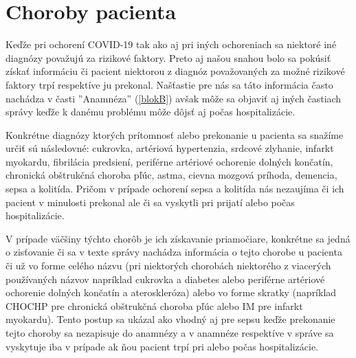 \section{Choroby pacienta}

Keďže pri ochorení COVID-19 tak ako aj pri iných ochoreniach sa niektoré iné diagnózy považujú za rizikové faktory. Preto aj našou snahou bolo sa pokúsiť získať informáciu či pacient niektorou z diagnóz považovaných za možné rizikové faktory trpí respektíve ju prekonal. Našťastie pre nás sa táto informácia často nachádza v časti ''Anamnéza'' (\ref{blokB}) avšak môže sa objaviť aj iných častiach správy keďže k danému problému môže dôjsť aj počas hospitalizácie.

Konkrétne diagnózy ktorých prítomnosť alebo prekonanie u pacienta sa snažíme určiť sú následovné: cukrovka, artériová hypertenzia, srdcové zlyhanie, infarkt myokardu, fibrilácia predsiení, periférne artériové ochorenie dolných končatín, chronická obštrukčná choroba pľúc, astma, cievna mozgová príhoda, demencia, sepsa a kolitída. Pričom v prípade ochorení sepsa a kolitída nás nezaujíma či ich pacient v minulosti prekonal ale či sa vyskytli pri prijatí alebo počas hospitalizácie.

V prípade väčšiny týchto chorôb je ich získavanie priamočiare, konkrétne sa jedná o zisťovanie či sa v texte správy nachádza informácia o tejto chorobe u pacienta či už vo forme celého názvu (pri niektorých chorobách niektorého z viacerých používaných názvov napríklad cukrovka a diabetes alebo periférne artériové ochorenie dolných končatín a ateroskleróza) alebo vo forme skratky (napríklad CHOCHP pre chronická obštrukčná choroba pľúc alebo IM pre infarkt myokardu). Tento postup sa ukázal ako vhodný aj pre sepsu keďže prekonanie tejto choroby sa nezapisuje do anamnézy a v anamnéze respektíve v správe sa vyskytuje iba v prípade ak ňou pacient trpí pri alebo počas hospitalizácie.

